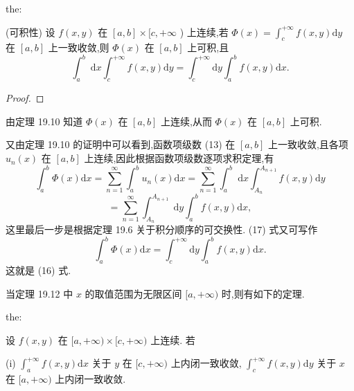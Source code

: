 \begin{theorem}{}{the:}

\end{theorem}
 (可积性) 设 \(f\left( {x,y}\right)\) 在 \(\left\lbrack  {a,b}\right\rbrack   \times  \lbrack c, + \infty\) ) 上连续,若 \(\Phi \left( x\right)  = {\int }_{c}^{+\infty }f\left( {x,y}\right) \mathrm{d}y\) 在 \(\left\lbrack  {a,b}\right\rbrack\) 上一致收敛,则 \(\Phi \left( x\right)\) 在 \(\left\lbrack  {a,b}\right\rbrack\) 上可积,且
\[
{\int }_{a}^{b}\mathrm{\;d}x{\int }_{c}^{+\infty }f\left( {x,y}\right) \mathrm{d}y = {\int }_{c}^{+\infty }\mathrm{d}y{\int }_{a}^{b}f\left( {x,y}\right) \mathrm{d}x. \tag{16}
\]
\begin{proof}

\end{proof}
由定理 19.10 知道 \(\Phi \left( x\right)\) 在 \(\left\lbrack  {a,b}\right\rbrack\) 上连续,从而 \(\Phi \left( x\right)\) 在 \(\left\lbrack  {a,b}\right\rbrack\) 上可积.

又由定理 19.10 的证明中可以看到,函数项级数 (13) 在 \(\left\lbrack  {a,b}\right\rbrack\) 上一致收敛,且各项 \({u}_{n}\left( x\right)\) 在 \(\left\lbrack  {a,b}\right\rbrack\) 上连续,因此根据函数项级数逐项求积定理,有
\[
{\int }_{a}^{b}\Phi \left( x\right) \mathrm{d}x = \mathop{\sum }\limits_{{n = 1}}^{\infty }{\int }_{a}^{b}{u}_{n}\left( x\right) \mathrm{d}x = \mathop{\sum }\limits_{{n = 1}}^{\infty }{\int }_{a}^{b}\mathrm{\;d}x{\int }_{{A}_{n}}^{{A}_{n + 1}}f\left( {x,y}\right) \mathrm{d}y
\]
\[
= \mathop{\sum }\limits_{{n = 1}}^{\infty }{\int }_{{A}_{n}}^{{A}_{n + 1}}\mathrm{\;d}y{\int }_{a}^{b}f\left( {x,y}\right) \mathrm{d}x, \tag{17}
\]
这里最后一步是根据定理 19.6 关于积分顺序的可交换性. (17) 式又可写作
\[
{\int }_{a}^{b}\Phi \left( x\right) \mathrm{d}x = {\int }_{c}^{+\infty }\mathrm{d}y{\int }_{a}^{b}f\left( {x,y}\right) \mathrm{d}x.
\]
这就是 (16) 式.

当定理 19.12 中 \(x\) 的取值范围为无限区间 \(\lbrack a, + \infty )\) 时,则有如下的定理.

\begin{theorem}{}{the:}

\end{theorem}
 设 \(f\left( {x,y}\right)\) 在 \(\lbrack a, + \infty ) \times  \lbrack c, + \infty )\) 上连续. 若

(i) \({\int }_{a}^{+\infty }f\left( {x,y}\right) \mathrm{d}x\) 关于 \(y\) 在 \(\lbrack c, + \infty )\) 上内闭一致收敛, \({\int }_{c}^{+\infty }f\left( {x,y}\right) \mathrm{d}y\) 关于 \(x\) 在 \(\lbrack a, + \infty )\) 上内闭一致收敛.

